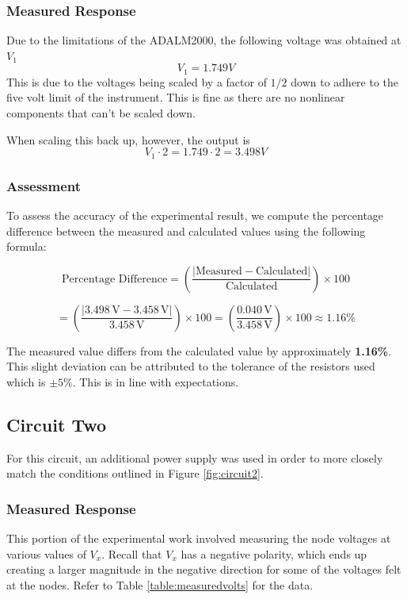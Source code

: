 \documentclass[12pt]{article}
\begin{document}
\subsubsection{Measured Response}
Due to the limitations of the ADALM2000, the following voltage was obtained at
$V_1$
\[
	V_1 = 1.749 V
\]
This is due to the voltages being scaled by a factor of $1/2$ down to adhere to
the five volt limit of the instrument. This is fine as there are no nonlinear
components that can't be scaled down.

When scaling this back up, however, the output is
\[
	V_1 \cdot 2 = 1.749 \cdot 2 = 3.498V
\]

\subsubsection{Assessment}
To assess the accuracy of the experimental result, we compute the percentage difference between the measured and calculated values using the following formula:

\[
	\text{Percentage Difference} = \left( \frac{|\text{Measured} - \text{Calculated}|}{\text{Calculated}} \right) \times 100
\]

\[
	= \left( \frac{|3.498\,\text{V} - 3.458\,\text{V}|}{3.458\,\text{V}} \right) \times 100 = \left( \frac{0.040\,\text{V}}{3.458\,\text{V}} \right) \times 100 \approx 1.16\%
\]

The measured value differs from the calculated value by approximately
\textbf{1.16\%}. This slight deviation can be attributed to the tolerance of the
resistors used which is $\pm 5\%$. This is in line with expectations.
\subsection{Circuit Two}
For this circuit, an additional power supply was used in order to more closely
match the conditions outlined in Figure \ref{fig:circuit2}.

\subsubsection{Measured Response}
This portion of the experimental work involved measuring the node voltages at
various values of $V_x$. Recall that $V_x$ has a negative polarity, which ends
up creating a larger magnitude in the negative direction for some of the
voltages felt at the nodes. Refer to Table \ref{table:measuredvolts} for the
data.
\end{document}
